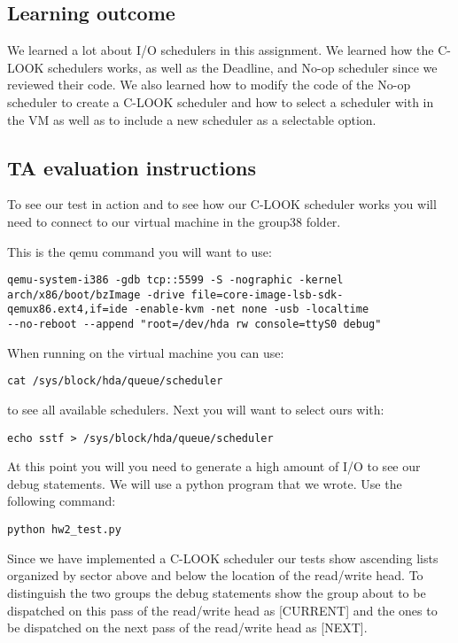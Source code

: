 \documentclass[journal,10pt,onecolumn,letterpaper,draftclsnofoot]{IEEEtran}
\begin{document}
\subsection{Learning outcome}

We learned a lot about I/O schedulers in this assignment. We learned how the C-LOOK schedulers works, as well as the Deadline, and No-op scheduler since we reviewed their code. We also learned how to modify the code of the No-op scheduler to create a C-LOOK scheduler and how to select a scheduler with in the VM as well as to include a new scheduler as a selectable option.

\subsection{TA evaluation instructions}

To see our test in action and to see how our C-LOOK scheduler works you will need to connect to our virtual machine in the group38 folder. 

This is the qemu command you will want to use:

\begin{verbatim}
qemu-system-i386 -gdb tcp::5599 -S -nographic -kernel
arch/x86/boot/bzImage -drive file=core-image-lsb-sdk-
qemux86.ext4,if=ide -enable-kvm -net none -usb -localtime 
--no-reboot --append "root=/dev/hda rw console=ttyS0 debug"
\end{verbatim}

When running on the virtual machine you can use:

\begin{verbatim}
cat /sys/block/hda/queue/scheduler
\end{verbatim}

to see all available schedulers. Next you will want to select
ours with:

\begin{verbatim}
echo sstf > /sys/block/hda/queue/scheduler
\end{verbatim}

At this point you will you need to generate a high amount of I/O to
see our debug statements. We will use a python program that we wrote. Use the following command:

\begin{verbatim}
python hw2_test.py
\end{verbatim}

Since we have implemented a C-LOOK scheduler our tests show ascending lists organized by sector above and below the location of the read/write head. To distinguish the two groups the debug statements show the group about to be dispatched on this pass of the read/write head as [CURRENT] and the ones to be dispatched on the next pass of the read/write head as [NEXT].
\end{document}
